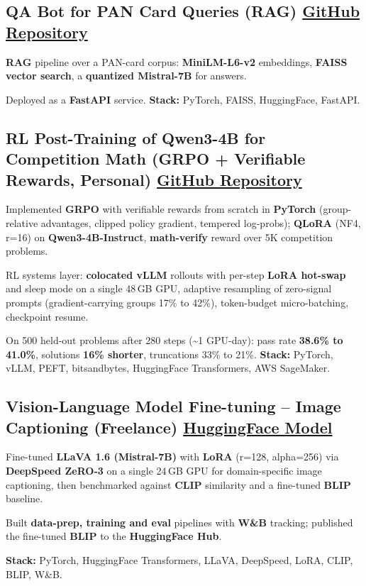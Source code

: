 \documentclass[letter,10pt]{article}
\begin{document}
\subsection{QA Bot for PAN Card Queries (RAG) \hfill \href{https://github.com/sunil448832/Natural-Language-Processing/tree/master/RAG(Retrieval\%20Augment\%20Generation)}{GitHub Repository}}
\begin{zitemize}
\item \textbf{RAG} pipeline over a PAN-card corpus: \textbf{MiniLM-L6-v2} embeddings, \textbf{FAISS} \textbf{vector search}, a \textbf{quantized Mistral-7B} for answers.
\item Deployed as a \textbf{FastAPI} service. \textbf{Stack:} PyTorch, FAISS, HuggingFace, FastAPI.
\end{zitemize}

\subsection{RL Post-Training of Qwen3-4B for Competition Math (GRPO + Verifiable Rewards, Personal) \hfill \href{https://github.com/sunil448832/preference-alignment-grpo}{GitHub Repository}}
\begin{zitemize}
\item Implemented \textbf{GRPO} with verifiable rewards from scratch in \textbf{PyTorch} (group-relative advantages, clipped policy gradient, tempered log-probs); \textbf{QLoRA} (NF4, r=16) on \textbf{Qwen3-4B-Instruct}, \textbf{math-verify} reward over 5K competition problems.
\item RL systems layer: \textbf{colocated vLLM} rollouts with per-step \textbf{LoRA hot-swap} and sleep mode on a single 48\,GB GPU, adaptive resampling of zero-signal prompts (gradient-carrying groups 17\% to 42\%), token-budget micro-batching, checkpoint resume.
\item On 500 held-out problems after 280 steps (\textasciitilde1 GPU-day): pass rate \textbf{38.6\% to 41.0\%}, solutions \textbf{16\% shorter}, truncations 33\% to 21\%. \textbf{Stack:} PyTorch, vLLM, PEFT, bitsandbytes, HuggingFace Transformers, AWS SageMaker.
\end{zitemize}

\subsection{Vision-Language Model Fine-tuning – Image Captioning (Freelance) \hfill \href{https://huggingface.co/sunil448832/blip-model}{HuggingFace Model}}
\begin{zitemize}
\item Fine-tuned \textbf{LLaVA 1.6 (Mistral-7B)} with \textbf{LoRA} (r=128, alpha=256) via \textbf{DeepSpeed ZeRO-3} on a single 24\,GB GPU for domain-specific image captioning, then benchmarked against \textbf{CLIP} similarity and a fine-tuned \textbf{BLIP} baseline.
\item Built \textbf{data-prep, training and eval} pipelines with \textbf{W\&B} tracking; published the fine-tuned \textbf{BLIP} to the \textbf{HuggingFace Hub}.
\item \textbf{Stack:} PyTorch, HuggingFace Transformers, LLaVA, DeepSpeed, LoRA, CLIP, BLIP, W\&B.
\end{zitemize}
\end{document}
